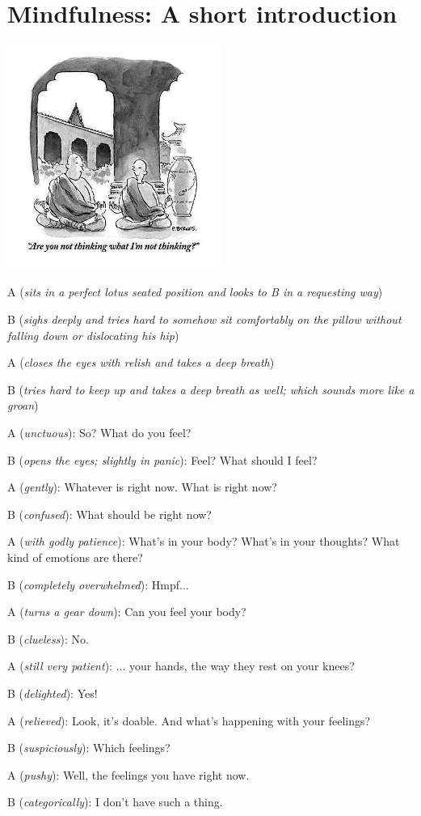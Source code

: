 \section{Mindfulness: A short introduction}

\begin{center}
\includegraphics[width=7cm]{images/11_mindfulness.png}
\end{center}

\begin{leftindent}

A (\textit{sits in a perfect lotus seated position and looks to B in a requesting way})

B (\textit{sighs deeply and tries hard to somehow sit comfortably on the pillow without falling down or dislocating his hip})

A (\textit{closes the eyes with relish and takes a deep breath})

B (\textit{tries hard to keep up and takes a deep breath as well; which sounds more like a groan})

A (\textit{unctuous}): So? What do you feel?

B (\textit{opens the eyes; slightly in panic}): Feel? What should I feel?

A (\textit{gently}): Whatever is right now. What is right now?

B (\textit{confused}): What should be right now?

A (\textit{with godly patience}): What's in your body? What's in your thoughts? What kind of emotions are there?

B (\textit{completely overwhelmed}): Hmpf...

A (\textit{turns a gear down}): Can you feel your body?

B (\textit{clueless}): No.

A (\textit{still very patient}): ... your hands, the way they rest on your knees?

B (\textit{delighted}): Yes!

A (\textit{relieved}): Look, it's doable. And what's happening with your feelings?

B (\textit{suspiciously}): Which feelings?

A (\textit{pushy}): Well, the feelings you have right now.

B (\textit{categorically}): I don't have such a thing.
\end{leftindent}

